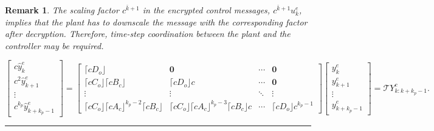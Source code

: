 \documentclass[journal, twoside, web]{ieeecolorpreprint}
\newtheorem{rem}{Remark}
\begin{document}
\begin{rem}
    The scaling factor $c^{\bar k+1}$ in the encrypted control messages, $c^{\bar k+1}u^e_k$, implies that the plant has to downscale the message with the corresponding factor after decryption. Therefore, time-step coordination between the plant and the controller may be required. %
\end{rem}
\begin{figure*}
\begin{equation} \label{eq:long_dyn_cont}
    \begin{bmatrix}
        c \hat y^e_k \\ c^2 \hat y_{k+1}^e \\ \vdots \\ c^{k_p}\hat y_{k+k_p-1}^e
    \end{bmatrix}  
    = \begin{bmatrix}
        \lceil c D_o \rfloor & \textbf{0} & \cdots & \textbf{0} \\
        \lceil c C_o \rfloor \lceil c B_c \rfloor & \lceil c D_o \rfloor c & \cdots & \textbf{0}  \\
        \vdots & \vdots &  \ddots &  \vdots \\
         \lceil c C_o \rfloor \lceil c A_c \rfloor^{k_p-2} \lceil c B_c \rfloor &  \lceil c C_o \rfloor \lceil c A_c \rfloor^{k_p-3} \lceil c B_c \rfloor c & \cdots &  \lceil c D_o \rfloor c^{k_p-1}
    \end{bmatrix} \begin{bmatrix}
         y^e_{k} \\  y_{k+1}^e \\ \vdots \\  y_{k+k_p-1}^e
    \end{bmatrix} 
    = \mathcal{T} Y^c_{k:k+k_p-1}.
\end{equation}
\hrule
\end{figure*}
\end{document}
